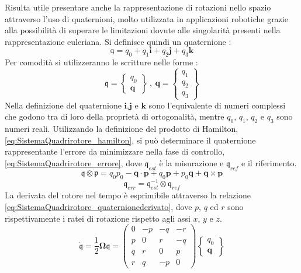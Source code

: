 Risulta utile presentare anche la rappresentazione di rotazioni nello spazio attraverso l'uso di quaternioni, molto utilizzata in applicazioni robotiche grazie alla possibilità di superare le limitazioni dovute alle singolarità presenti nella rappresentazione euleriana.
Si definisce quindi un quaternione :
\[ 
	\mathbb{q} = q_0 + q_1 \mathbf{i} + q_2 \mathbf{j} + q_3 \mathbf{k}
\]
Per comodità si utilizzeranno le scritture nelle forme :
\[ 
	\mathfrak{q} = \begin{Bmatrix}
		q_0\\
		\mathbf{q}
	\end{Bmatrix} \ , \ \mathbf{q} = \begin{Bmatrix}
		q_1\\
		q_2\\
		q_3
	\end{Bmatrix}
\]
Nella definizione del quaternione $\mathbf{i}$,$\mathbf{j}$ e $\mathbf{k}$ sono l'equivalente di numeri complessi che godono tra di loro della proprietà di ortogonalità, mentre $q_0$, $q_1$, $q_2$ e $q_3$ sono numeri reali. Utilizzando la definizione del prodotto di Hamilton, \ref{eq:SistemaQuadrirotore_hamilton}, si può determinare il quaternione rappresentante l'errore da minimizzare nella fase di controllo, \ref{eq:SistemaQuadrirotore_errore}, dove $\mathfrak{q}_{est}$ è la misurazione e $ \mathfrak{q}_{ref}$ e il riferimento.
\begin{equation}\label{eq:SistemaQuadrirotore_hamilton}
	\mathfrak{q} \otimes \mathfrak{p} = q_0 p_0 - \mathbf{q} \cdot \mathbf{p} + q_0 \mathbf{p} + p_0 \mathbf{q} + \mathbf{q} \times \mathbf{p}
\end{equation}
\begin{equation}\label{eq:SistemaQuadrirotore_errore}
	\mathfrak{q}_{err} = \mathfrak{q}_{est}^{-1} \otimes \mathfrak{q}_{ref}
\end{equation}
La derivata del rotore nel tempo è esprimibile attraverso la relazione \ref{eq:SistemaQuadrirotore_quaternionederivato}, dove $p$, $q$ ed $r$ sono rispettivamente i ratei di rotazione rispetto agli assi $x$, $y$ e $z$.
\begin{equation}\label{eq:SistemaQuadrirotore_quaternionederivato}
\mathfrak{\dot{q}} = \frac{1}{2} \mathbf{\Omega} \mathfrak{q} =
	\begin{pmatrix}
		0 & -p & -q & -r \\
		p &  0 &  r & -q \\
		q &  r &  0 &  p \\
		r &  q & -p &  0 
	\end{pmatrix}
	\begin{Bmatrix}
		q_0 \\
		\mathbf{q}
	\end{Bmatrix}
\end{equation}
